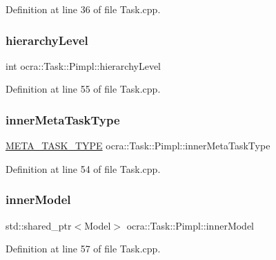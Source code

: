 Definition at line 36 of file Task.\+cpp.

\hypertarget{structocra_1_1Task_1_1Pimpl_a16b28bba8d6425b4bc7375297dd2cd47}{}\label{structocra_1_1Task_1_1Pimpl_a16b28bba8d6425b4bc7375297dd2cd47} 
\subsubsection{\texorpdfstring{hierarchy\+Level}{hierarchyLevel}}
{\footnotesize\ttfamily int ocra\+::\+Task\+::\+Pimpl\+::hierarchy\+Level}



Definition at line 55 of file Task.\+cpp.

\hypertarget{structocra_1_1Task_1_1Pimpl_a74f9aa5427e6161018203a9e75da3bf4}{}\label{structocra_1_1Task_1_1Pimpl_a74f9aa5427e6161018203a9e75da3bf4} 
\subsubsection{\texorpdfstring{inner\+Meta\+Task\+Type}{innerMetaTaskType}}
{\footnotesize\ttfamily \hyperlink{classocra_1_1Task_a8ddf2840d178ca273e886c9ca95248fe}{M\+E\+T\+A\+\_\+\+T\+A\+S\+K\+\_\+\+T\+Y\+PE} ocra\+::\+Task\+::\+Pimpl\+::inner\+Meta\+Task\+Type}



Definition at line 54 of file Task.\+cpp.

\hypertarget{structocra_1_1Task_1_1Pimpl_a6a98b6fb3efab282ba6d5092245b36d1}{}\label{structocra_1_1Task_1_1Pimpl_a6a98b6fb3efab282ba6d5092245b36d1} 
\subsubsection{\texorpdfstring{inner\+Model}{innerModel}}
{\footnotesize\ttfamily std\+::shared\+\_\+ptr$<$Model$>$ ocra\+::\+Task\+::\+Pimpl\+::inner\+Model}



Definition at line 57 of file Task.\+cpp.

